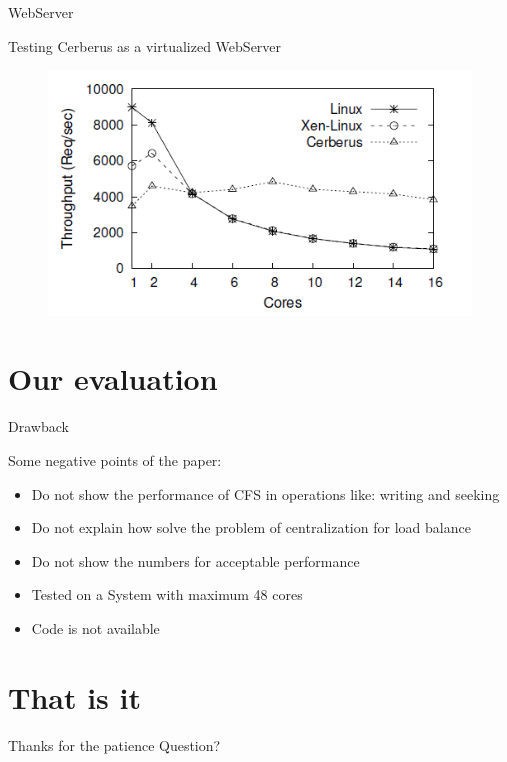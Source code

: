 \documentclass{beamer}
\begin{document}
	\begin{frame}{WebServer}
	
		Testing Cerberus as a virtualized WebServer
	
		\begin{figure} [H]
			\centering
			\includegraphics[scale=0.60]{img/cerberus-webserver}
		\end{figure}		
	
	\end{frame}	
	
\section{Our evaluation}

	\begin{frame}{Drawback}

	Some negative points of the paper:
	\begin{itemize}
	\item Do not show the performance of CFS in operations like: writing and seeking
	\item Do not explain how solve the problem of centralization for load balance
	\item Do not show the numbers for acceptable performance
	\item Tested on a System with maximum 48 cores
	\item Code is not available
	\end{itemize}

	\end{frame}

\section{That is it}

	\begin{frame}{}

	\begin{alertblock}{Thanks for the patience}
	Question?
	\end{alertblock}

	\end{frame}
\end{document}
